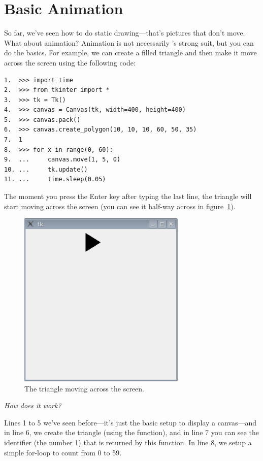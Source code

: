 \section{Basic Animation}

So far, we've seen how to do static drawing---that's pictures that don't move. What about animation? Animation is not necessarily 's strong suit, but you can do the basics. For example, we can create a filled triangle and then make it move across the screen using the following code:

\begin{Verbatim}[frame=single]
1.  >>> import time
2.  >>> from tkinter import *
3.  >>> tk = Tk()
4.  >>> canvas = Canvas(tk, width=400, height=400)
5.  >>> canvas.pack()
6.  >>> canvas.create_polygon(10, 10, 10, 60, 50, 35)
7.  1
8.  >>> for x in range(0, 60):
9.  ...     canvas.move(1, 5, 0)
10. ...     tk.update()
11. ...     time.sleep(0.05)
\end{Verbatim}

The moment you press the Enter key after typing the last line, the triangle will start moving across the screen (you can see it half-way across in figure~\ref{fig44}).

\begin{figure}
\begin{center}
\includegraphics[width=80mm]{images/figure44}
\end{center}
\caption{The triangle moving across the screen.}\label{fig44}
\end{figure}

\par
\emph{How does it work?}
\par
Lines 1 to 5 we've seen before---it's just the basic setup to display a canvas---and in line 6, we create the triangle (using the  function), and in line 7 you can see the identifier (the number 1) that is returned by this function. In line 8, we setup a simple for-loop to count from 0 to 59.

